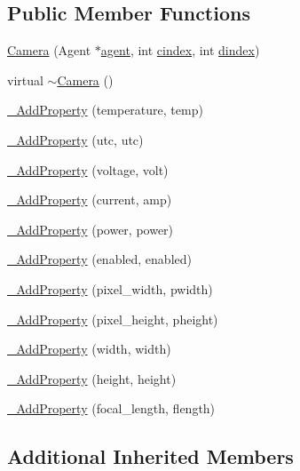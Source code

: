\subsection*{Public Member Functions}
\begin{DoxyCompactItemize}
\item 
\hyperlink{classcubesat_1_1Camera_ae1731bde4ac0f35492e17b1319c4840e}{Camera} (Agent $\ast$\hyperlink{classcubesat_1_1Device_a8499108eccaf7375bea8ead0182391a6}{agent}, int \hyperlink{classcubesat_1_1Device_a1deca725b01f8ef37e49662da6db4e53}{cindex}, int \hyperlink{classcubesat_1_1Device_a8a2b3d6d7400e6796c31705058172982}{dindex})
\item 
virtual \hyperlink{classcubesat_1_1Camera_a8341dc6e32e8578a75e6fbe9ed6d1234}{$\sim$\+Camera} ()
\item 
\hyperlink{classcubesat_1_1Camera_a4f716ff4fcce35b24596c0b81c103efb}{\+\_\+\+Add\+Property} (temperature, temp)
\item 
\hyperlink{classcubesat_1_1Camera_a2f84cf3b74e6c46765c5b557d72bd39c}{\+\_\+\+Add\+Property} (utc, utc)
\item 
\hyperlink{classcubesat_1_1Camera_a849d2605913ca6f995b79d90dd260db6}{\+\_\+\+Add\+Property} (voltage, volt)
\item 
\hyperlink{classcubesat_1_1Camera_a2586b6fceabbf85db5842e6e16351b93}{\+\_\+\+Add\+Property} (current, amp)
\item 
\hyperlink{classcubesat_1_1Camera_a0465aa58841962ef8be4e8c5523194ec}{\+\_\+\+Add\+Property} (power, power)
\item 
\hyperlink{classcubesat_1_1Camera_afa9900e8a42e4b91f82e7bf005e6c28d}{\+\_\+\+Add\+Property} (enabled, enabled)
\item 
\hyperlink{classcubesat_1_1Camera_af54a43e0cf808c26f32c8b8096ebc3f7}{\+\_\+\+Add\+Property} (pixel\+\_\+width, pwidth)
\item 
\hyperlink{classcubesat_1_1Camera_a29cd2ba4b65f32cb43e7e96fe242d258}{\+\_\+\+Add\+Property} (pixel\+\_\+height, pheight)
\item 
\hyperlink{classcubesat_1_1Camera_aad0910a49f04446c5f5266b37262692e}{\+\_\+\+Add\+Property} (width, width)
\item 
\hyperlink{classcubesat_1_1Camera_aeed37c12ee4119bf54fc7124fba19b97}{\+\_\+\+Add\+Property} (height, height)
\item 
\hyperlink{classcubesat_1_1Camera_a136f46ab3e38b076adba6c4d718a80ab}{\+\_\+\+Add\+Property} (focal\+\_\+length, flength)
\end{DoxyCompactItemize}
\subsection*{Additional Inherited Members}


